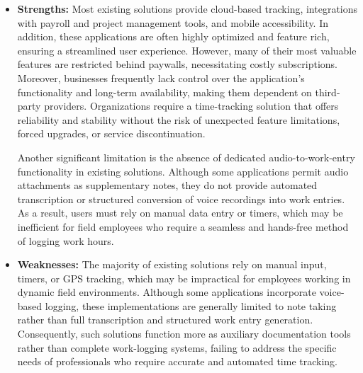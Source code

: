 \documentclass[
  digital,     %
  oneside,     %
  nosansbold,  %
  nocolorbold, %
  lof,         %
  lot,         %
]{fithesis4}
\begin{document}
\begin{itemize}  
    \item \textbf{Strengths:} Most existing solutions provide cloud-based tracking, integrations with payroll and project management tools, and mobile accessibility. In addition, these applications are often highly optimized and feature rich, ensuring a streamlined user experience. However, many of their most valuable features are restricted behind paywalls, necessitating costly subscriptions. Moreover, businesses frequently lack control over the application's functionality and long-term availability, making them dependent on third-party providers. Organizations require a time-tracking solution that offers reliability and stability without the risk of unexpected feature limitations, forced upgrades, or service discontinuation.  

    Another significant limitation is the absence of dedicated audio-to-work-entry functionality in existing solutions. Although some applications permit audio attachments as supplementary notes, they do not provide automated transcription or structured conversion of voice recordings into work entries. As a result, users must rely on manual data entry or timers, which may be inefficient for field employees who require a seamless and hands-free method of logging work hours.  

    \item \textbf{Weaknesses:} The majority of existing solutions rely on manual input, timers, or GPS tracking, which may be impractical for employees working in dynamic field environments. Although some applications incorporate voice-based logging, these implementations are generally limited to note taking rather than full transcription and structured work entry generation. Consequently, such solutions function more as auxiliary documentation tools rather than complete work-logging systems, failing to address the specific needs of professionals who require accurate and automated time tracking.

\end{itemize}

\shorthandoff{-}
\begin{markdown}
\end{markdown}
\shorthandon{-}
\end{document}
